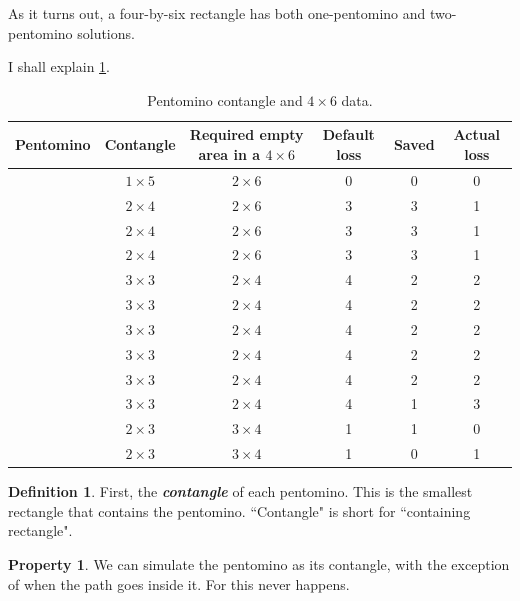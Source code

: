 \documentclass{article}
\newcommand{\pentI}{\smash{\colorbox{colorI!50}{I}}}
\newcommand{\pentF}{\smash{\colorbox{colorF!50}{F}}}%
\newcommand{\pentL}{\smash{\colorbox{colorL!50}{L}}}%
\newcommand{\pentP}{\smash{\colorbox{colorP!50}{P}}}
\newcommand{\pentN}{\smash{\colorbox{colorN!50}{N}}}
\newcommand{\pentT}{\smash{\colorbox{colorT!50}{T}}}
\newcommand{\pentU}{\smash{\colorbox{colorU!50}{U}}}
\newcommand{\pentV}{\smash{\colorbox{colorV!50}{V}}}
\newcommand{\pentW}{\smash{\colorbox{colorW!50}{W}}}
\newcommand{\pentX}{\smash{\colorbox{colorX!50}{X}}}
\newcommand{\pentY}{\smash{\colorbox{colorY!50}{Y}}}
\newcommand{\pentZ}{\smash{\colorbox{colorZ!50}{Z}}}
\newcommand{\authornote}[1]{\marginnote{\textcolor{authorcolor}{#1}}}
\theoremstyle{definition}%
\newtheorem{definition}[theorem]{Definition}
\newtheorem{property}[theorem]{Property}
\newcommand{\newterm}[1]{\textbf{\textit{#1}}}
\begin{document}
As it turns out, a four-by-six rectangle has both one-pentomino and two-pentomino solutions.

I shall explain \cref{tab:pentomino sizes}.
\begin{table}
    \centering
    \caption{Pentomino contangle and $4 \times 6$ data. \cite[?:??]{v1}}
    \begin{tabular}{cccccc}
        \toprule
        Pentomino & Contangle & Required empty area in a $4 \times 6$ & Default loss & Saved & Actual loss \\
        \midrule
        \pentI{} & $1 \times 5$ & $2 \times 6$ & 0 & 0 & 0 \\
        \pentL{} & $2 \times 4$ & $2 \times 6$ & 3 & 3 & 1 \\
        \pentN{} & $2 \times 4$ & $2 \times 6$ & 3 & 3 & 1 \\
        \pentY{} & $2 \times 4$ & $2 \times 6$ & 3 & 3 & 1 \\
        \pentF{} & $3 \times 3$ & $2 \times 4$ & 4 & 2 & 2 \\
        \pentT{} & $3 \times 3$ & $2 \times 4$ & 4 & 2 & 2 \\
        \pentV{} & $3 \times 3$ & $2 \times 4$ & 4 & 2 & 2 \\
        \pentW{} & $3 \times 3$ & $2 \times 4$ & 4 & 2 & 2 \\
        \pentZ{} & $3 \times 3$ & $2 \times 4$ & 4 & 2 & 2 \\
        \pentX{} & $3 \times 3$ & $2 \times 4$ & 4 & 1 & 3 \\
        \pentP{} & $2 \times 3$ & $3 \times 4$ & 1 & 1 & 0 \\
        \pentU{} & $2 \times 3$ & $3 \times 4$ & 1 & 0 & 1 \\
        \bottomrule
    \end{tabular}
    \label{tab:pentomino sizes}
\end{table}

\begin{definition}
First, the \newterm{contangle} of each pentomino.\authornote{Naming is hard}
This is the smallest rectangle that contains the pentomino.
``Contangle" is short for ``containing rectangle".
\end{definition}

\begin{property}
We can simulate the pentomino as its contangle, with the exception of when the path
goes inside it. For \pentI{} this never happens.
\end{property}
\end{document}
